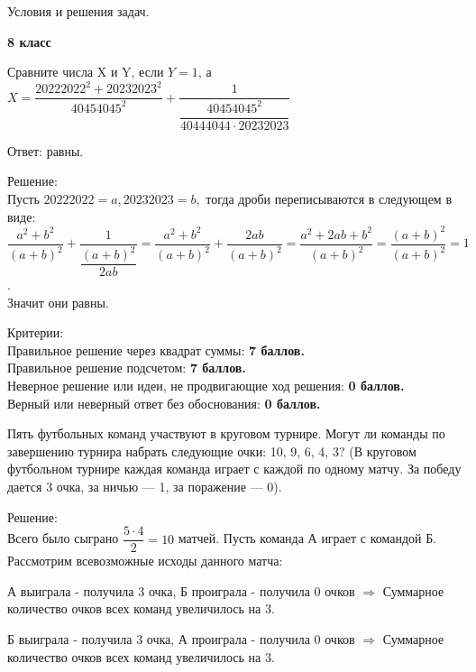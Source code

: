 \centerline{\Huge Условия и решения задач.}
\centerline{\bf \Huge 8 класс}

\hspace{3mm}


Сравните числа X и Y, если $Y = 1 $, а $X = \dfrac{20222022^2+20232023^2}{40454045^2} + \dfrac{1}{\dfrac{40454045^2}{40444044\cdot20232023}}$

\hspace{3mm}

Ответ: равны.

Решение:\\
Пусть $20222022 = a, 20232023 = b,$ тогда дроби переписываются в следующем в виде:\\

$\dfrac{a^2 + b^2}{(a+b)^2} + \dfrac{1}{\dfrac{(a+b)^2}{2ab}} = \dfrac{a^2 + b^2}{(a+b)^2} + \dfrac{2ab}{(a+b)^2} =\dfrac{a^2 + 2ab + b^2}{(a+b)^2}= \dfrac{(a+b)^2}{(a+b)^2} = 1 $. \\

Значит они равны.

\hspace{3mm}

Критерии:\\
Правильное решение через квадрат суммы: \textbf{7 баллов.}\\
Правильное решение подсчетом: \textbf{7 баллов.}\\
Неверное решение или идеи, не продвигающие ход решения: \textbf{0 баллов.}\\
Верный или неверный ответ без обоснования: \textbf{0 баллов.
}

\hspace{3mm}

Пять футбольных команд участвуют в круговом турнире. Могут ли команды по завершению турнира набрать следующие очки: 10, 9, 6, 4, 3? (В круговом футбольном турнире каждая команда играет с каждой по одному матчу. За победу дается 3 очка, за ничью — 1, за поражение — 0).

\hspace{3mm}

Решение:\\
Всего было сыграно $\dfrac{5\cdot4}{2} = 10$ матчей. Пусть команда А играет с командой Б. Рассмотрим всевозможные исходы данного матча:

А выиграла - получила 3 очка, Б проиграла - получила 0 очков $\Rightarrow$ Суммарное количество очков всех команд увеличилось на 3.

Б выиграла - получила 3 очка, А проиграла - получила 0 очков $\Rightarrow$ Суммарное количество очков всех команд увеличилось на 3.

